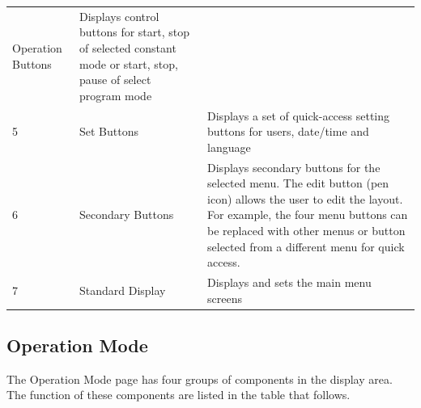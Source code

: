 \begin{longtable}[]{@{}lll@{}}
\begin{minipage}[t]{0.23\columnwidth}
Operation Buttons\strut
\end{minipage} & \begin{minipage}[t]{0.65\columnwidth}\raggedright
Displays control buttons for start, stop of selected constant mode or
start, stop, pause of select program mode\strut
\end{minipage}\tabularnewline
\begin{minipage}[t]{0.04\columnwidth}\raggedright
5\strut
\end{minipage} & \begin{minipage}[t]{0.23\columnwidth}\raggedright
Set Buttons\strut
\end{minipage} & \begin{minipage}[t]{0.65\columnwidth}\raggedright
Displays a set of quick-access setting buttons for users, date/time and
language\strut
\end{minipage}\tabularnewline
\begin{minipage}[t]{0.04\columnwidth}\raggedright
6\strut
\end{minipage} & \begin{minipage}[t]{0.23\columnwidth}\raggedright
Secondary Buttons\strut
\end{minipage} & \begin{minipage}[t]{0.65\columnwidth}\raggedright
Displays secondary buttons for the selected menu. The edit button (pen
icon) allows the user to edit the layout. For example, the four menu
buttons can be replaced with other menus or button selected from a
different menu for quick access.\strut
\end{minipage}\tabularnewline
\begin{minipage}[t]{0.04\columnwidth}\raggedright
7\strut
\end{minipage} & \begin{minipage}[t]{0.23\columnwidth}\raggedright
Standard Display\strut
\end{minipage} & \begin{minipage}[t]{0.65\columnwidth}\raggedright
Displays and sets the main menu screens\strut
\end{minipage}\tabularnewline
\bottomrule
\end{longtable}


\subsection{Operation Mode}

The Operation Mode page has four groups of components in the display
area. The function of these components are listed in the table that
follows.

